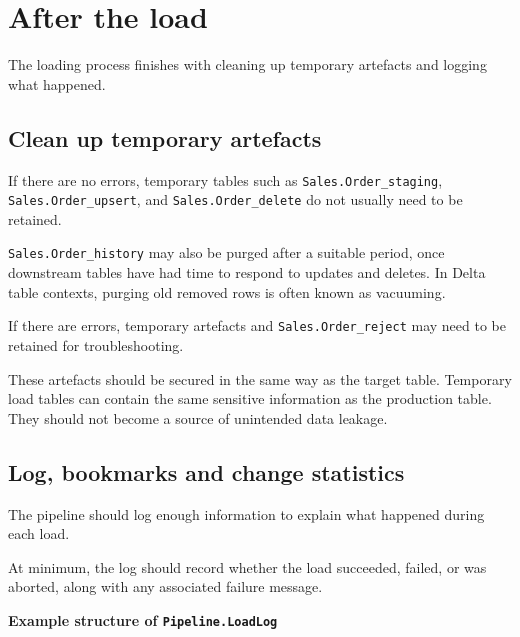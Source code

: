 \documentclass[10pt,openany,10pt]{book}
\begin{document}
\section{After the load}\label{after-the-load}

The loading process finishes with cleaning up temporary artefacts and
logging what happened.

\subsection{Clean up temporary
artefacts}\label{clean-up-temporary-artefacts}

If there are no errors, temporary tables such as
\texttt{Sales.Order\_staging}, \texttt{Sales.Order\_upsert}, and
\texttt{Sales.Order\_delete} do not usually need to be retained.

\texttt{Sales.Order\_history} may also be purged after a suitable
period, once downstream tables have had time to respond to updates and
deletes. In Delta table contexts, purging old removed rows is often
known as vacuuming.

If there are errors, temporary artefacts and
\texttt{Sales.Order\_reject} may need to be retained for
troubleshooting.

These artefacts should be secured in the same way as the target table.
Temporary load tables can contain the same sensitive information as the
production table. They should not become a source of unintended data
leakage.

\subsection{Log, bookmarks and change
statistics}\label{log-bookmarks-and-change-statistics}

The pipeline should log enough information to explain what happened
during each load.

At minimum, the log should record whether the load succeeded, failed, or
was aborted, along with any associated failure message.

\textbf{Example structure of \texttt{Pipeline.LoadLog}}
\end{document}
